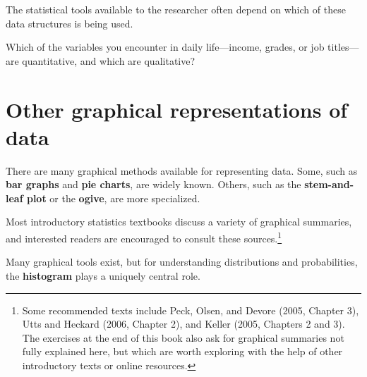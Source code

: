 \documentclass[
  letterpaper,
  DIV=11,
  numbers=noendperiod]{scrreprt}
\begin{document}
The statistical tools available to the researcher often depend on which
of these data structures is being used.

\begin{tcolorbox}[enhanced jigsaw, coltitle=black, colbacktitle=quarto-callout-note-color!10!white, left=2mm, bottomrule=.15mm, bottomtitle=1mm, colback=white, titlerule=0mm, colframe=quarto-callout-note-color-frame, breakable, leftrule=.75mm, toptitle=1mm, opacitybacktitle=0.6, rightrule=.15mm, title=\textcolor{quarto-callout-note-color}{\faInfo}\hspace{0.5em}{Pause and think}, arc=.35mm, opacityback=0, toprule=.15mm]

Which of the variables you encounter in daily life---income, grades, or
job titles---are quantitative, and which are qualitative?

\end{tcolorbox}

\section{Other graphical representations of
data}\label{other-graphical-representations-of-data}

There are many graphical methods available for representing data. Some,
such as \textbf{bar graphs} and \textbf{pie charts}, are widely known.
Others, such as the \textbf{stem-and-leaf plot} or the \textbf{ogive},
are more specialized.

Most introductory statistics textbooks discuss a variety of graphical
summaries, and interested readers are encouraged to consult these
sources.\footnote{Some recommended texts include Peck, Olsen, and Devore
  (2005, Chapter 3), Utts and Heckard (2006, Chapter 2), and Keller
  (2005, Chapters 2 and 3). The exercises at the end of this book also
  ask for graphical summaries not fully explained here, but which are
  worth exploring with the help of other introductory texts or online
  resources.}

\begin{tcolorbox}[enhanced jigsaw, coltitle=black, colbacktitle=quarto-callout-important-color!10!white, left=2mm, bottomrule=.15mm, bottomtitle=1mm, colback=white, titlerule=0mm, colframe=quarto-callout-important-color-frame, breakable, leftrule=.75mm, toptitle=1mm, opacitybacktitle=0.6, rightrule=.15mm, title=\textcolor{quarto-callout-important-color}{\faExclamation}\hspace{0.5em}{Big picture}, arc=.35mm, opacityback=0, toprule=.15mm]

Many graphical tools exist, but for understanding distributions and
probabilities, the \textbf{histogram} plays a uniquely central role.

\end{tcolorbox}
\end{document}
